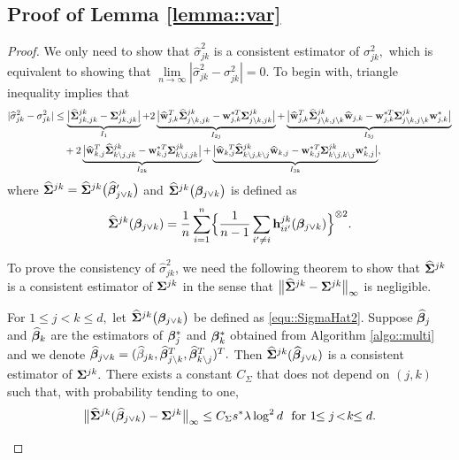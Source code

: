 \documentclass[twoside,11pt]{article}
\newcommand*{\hbbeta}{\hat{\bbeta}}
\newcommand*{\bbetas}{\bbeta^*}
\newcommand*{\hSigma}{\hat{\bSigma}}
\newcommand*{\hw}{\hat{\wb}}
\newcommand*{\sw}{\wb^*}
\newcommand*{\limn}{\lim \limits_{n\rightarrow \infty} }
\begin{document}
\subsection{Proof of Lemma \ref{lemma::var}}\label{proof::lemma_var}
\begin{proof} 
We only need to show that $\hat{\sigma}_{jk}^2$ is a consistent estimator of $\sigma_{jk}^2,$ 
which is equivalent to showing that 
 $\limn  |\hat\sigma_{jk}^2 - \sigma_{jk}^2 |= 0.$ To begin with,  triangle inequality implies that  
\begin{align*}
  |\hat\sigma_{jk}^2 - \sigma_{jk}^2  |  &\leq  \underbrace{\bigl| \hSigma^{jk}_{jk,jk} - \bSigma^{jk}_{jk,jk} \bigr |}_{I_1}  + 2\underbrace{ \bigl | \hw_{j,k} ^T \hSigma^{jk}_{j\setminus k,jk} - {\sw_{j,k}}\!\!\!\!^T \bSigma^{jk}_{j\setminus k,jk}\bigr | }_{I_{2j}}  + \underbrace{ \bigl | \hw_{j,k}^T \hSigma^{jk}_{j\setminus k,j\setminus k} \hw_{j,k}- {\sw_{j,k}}\!\!\!\!^T\bSigma^{jk}_{j\setminus k,j\setminus k} \sw_{j,k}\bigr |}_{I_{3j}}\\
&\quad + 2\underbrace{ \bigl | \hw_{k,j} ^T \hSigma^{jk}_{k\setminus j, jk} - {\sw_{k,j}}\!\!\!\!^T \bSigma^{jk}_{k\setminus j, jk}\bigr | }_{I_{2k}}  + \underbrace{ \bigl | \hw_{k,j}\!\!\!\!^T \hSigma^{jk}_{k\setminus j,k\setminus j} \hw_{k,j}- {\sw_{k,j}}\!\!\!\!^T\bSigma^{jk}_{k\setminus j,k\setminus j} \sw_{k,j}\bigr |}_{I_{3k}},
\end{align*}
where $\hSigma^{jk} = \hSigma^{jk}\bigl(\hbbeta_{j\vee k}'\bigr)$  and $\hSigma^{jk}\bigl(\bbeta_{j\vee k}\bigr)$ is defined as
\begin{align}\label{equ::SigmaHat2}
\hSigma^{jk}(\bbeta_{j\vee k})  = \frac{1}{n} \sum\limits_{i=1}^n \Bigl\{\frac{1}{n-1} \sum\limits_{i'\neq i} \hb_{ii'}^{jk}(\bbeta_{j \vee k}) \Bigr\}^{\otimes 2}.
\end{align}

To prove the consistency of $\hat \sigma_{jk}^2$, we need the following theorem to show that $\hSigma^{jk}$ is a consistent estimator of $\bm{\Sigma}^{jk}$ in the sense that $\bigl \| \hSigma^{jk} - \bSigma ^{jk} \bigr\|_\infty$ is negligible.

\begin{lemma}\label{lemma::ErrorRateSigmaHat}
For $1\!\!\leq j\!<\!k\!\!\leq d, $  let $\hSigma^{jk}\bigl(\bbeta_{j\vee k}\bigr)$ be defined as \eqref{equ::SigmaHat2}. 
Suppose $\hbbeta_j$ and $\hbbeta_k$ are the estimators of $\bbetas_j$ and $\bbetas_k$ obtained from Algorithm \ref{algo::multi}  and we denote $\hbbeta_{j\vee k} = (\hat\beta_{jk}, \hbbeta_{j\setminus k}^T, \hbbeta_{k\setminus j}^T)^T. $ Then   $\hSigma^{jk}(\hbbeta_{j\vee k})$ is a consistent estimator of $\bm{\Sigma}^{jk}.$ 
There exists a constant $C_{\Sigma}$ that does not depend on $(j,k)$ such that, with probability tending to one,
$$
\big\|\hSigma^{jk}(\hbbeta_{j\vee k}) - \bSigma^{jk} \big\|_\infty \leq C_{\Sigma} s^* \lambda\log^2 d  ~~\text{for}~1\!\!\leq j\!<\!k\!\!\leq d.
$$


\end{lemma}
\end{proof}
\end{document}
